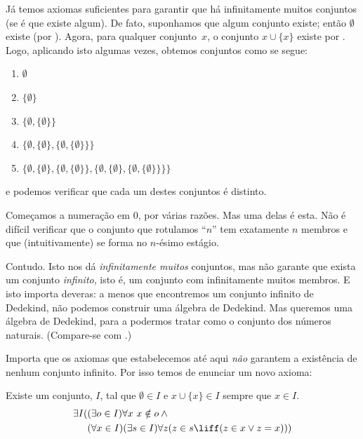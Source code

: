 \documentclass[../../../include/open-logic-section]{subfiles}
\begin{document}

Já temos axiomas suficientes para garantir que há infinitamente muitos
conjuntos (se é que existe algum). De fato, suponhamos que algum conjunto existe; então
$\emptyset$ existe (por ). Agora, para
qualquer conjunto~$x$, o conjunto $x \cup \{x\}$ existe por
. Logo, aplicando isto algumas
vezes, obtemos conjuntos como se segue:
\begin{enumerate}
	\item[0.] $\emptyset$ %
	\item[1.] $ \{\emptyset\}$ %
	\item[2.] $\{\emptyset, \{\emptyset\}\}$ %
	\item[3.] $\{\emptyset, \{\emptyset\}, \{\emptyset, \{\emptyset\}\}\}$ %
	\item[4.] $\{\emptyset, \{\emptyset\}, \{\emptyset, \{\emptyset\}\}, \{\emptyset, \{\emptyset\}, \{\emptyset, \{\emptyset\}\}\}\}$%
\end{enumerate}
e podemos verificar que cada um destes conjuntos é distinto. 

Começamos a numeração em $0$, por várias razões. Mas uma delas é esta. Não é
difícil verificar que o conjunto que rotulamos ``$n$'' tem exatamente $n$ membros e que (intuitivamente) se forma no $n$-ésimo estágio. 

Contudo. Isto nos dá \emph{infinitamente muitos} conjuntos, mas não
garante que exista um conjunto \emph{infinito}, isto é, um conjunto com
infinitamente muitos membros. E isto importa deveras: a menos que encontremos um
conjunto infinito de Dedekind, não podemos construir uma álgebra de Dedekind. Mas
queremos uma álgebra de Dedekind, para a podermos tratar como o conjunto dos
números naturais. (Compare-se com
.)

Importa que os axiomas que estabelecemos até aqui \emph{não}
garantem a existência de nenhum conjunto infinito. Por isso temos de enunciar um
novo axioma:

\begin{axiom}[Infinito]
Existe um conjunto, $I$, tal que $\emptyset \in I$ e $x \cup \{x\} \in I$ sempre que $x \in I$.
\begin{align*}
	\exists I( & (\exists o \in I)\forall x\ x \notin o \land {}\\
	& (\forall x \in I)(\exists s \in I)\forall z(z \in s \liff (z \in x \lor z = x)))
\end{align*}
\end{axiom}
\end{document}
